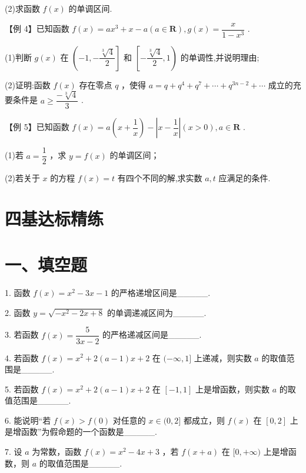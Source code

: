 (2)求函数 $f\left( x\right)$ 的单调区间.

【例 4】已知函数 $f\left( x\right)  = a{x}^{3} + x - a\left( {a \in  \mathbf{R}}\right) ,g\left( x\right)  = \dfrac{x}{1 - {x}^{3}}$ .

(1)判断 $g\left( x\right)$ 在 $\left( {-1, - \dfrac{\sqrt[3]{4}}{2}}\right\rbrack$ 和 $\left\lbrack  {-\dfrac{\sqrt[3]{4}}{2},1}\right)$ 的单调性,并说明理由;

(2)证明:函数 $f\left( x\right)$ 存在零点 $q$ ，使得 $a = q + {q}^{4} + {q}^{7} + \cdots  + {q}^{{3n} - 2} + \cdots$ 成立的充要条件是 $a \geq  \dfrac{-\sqrt[3]{4}}{3}$ .

【例 5】已知函数 $f\left( x\right)  = a\left( {x + \dfrac{1}{x}}\right)  - \left| {x - \dfrac{1}{x}}\right| \left( {x > 0}\right) ,a \in  \mathbf{R}$ .

(1)若 $a = \dfrac{1}{2}$ ，求 $y = f\left( x\right)$ 的单调区间；

(2)若关于 $x$ 的方程 $f\left( x\right)  = t$ 有四个不同的解,求实数 $a,t$ 应满足的条件.

\section*{四基达标精练}

\section*{一、填空题}

1. 函数 $f\left( x\right)  = {x}^{2} - {3x} - 1$ 的严格递增区间是\_\_\_\_\_.

2. 函数 $y = \sqrt{-{x}^{2} - {2x} + 8}$ 的单调递减区间为\_\_\_\_\_.

3. 若函数 $f\left( x\right)  = \dfrac{5}{{3x} - 2}$ 的严格递减区间是\_\_\_\_\_.

4. 若函数 $f\left( x\right)  = {x}^{2} + 2\left( {a - 1}\right) x + 2$ 在 $( - \infty ,1\rbrack$ 上递减，则实数 $a$ 的取值范围是\_\_\_\_\_.

5. 若函数 $f\left( x\right)  = {x}^{2} + 2\left( {a - 1}\right) x + 2$ 在 $\left\lbrack  {-1,1}\right\rbrack$ 上是增函数，则实数 $a$ 的取值范围是\_\_\_\_\_.

6. 能说明“若 $f\left( x\right)  > f\left( 0\right)$ 对任意的 $x \in  (0,2\rbrack$ 都成立，则 $f\left( x\right)$ 在 $\left\lbrack  {0,2}\right\rbrack$ 上是增函数”为假命题的一个函数是\_\_\_\_\_.

7. 设 $a$ 为常数，函数 $f\left( x\right)  = {x}^{2} - {4x} + 3$ ，若 $f\left( {x + a}\right)$ 在 $\lbrack 0, + \infty )$ 上是增函数，则 $a$ 的取值范围是\_\_\_\_\_.

